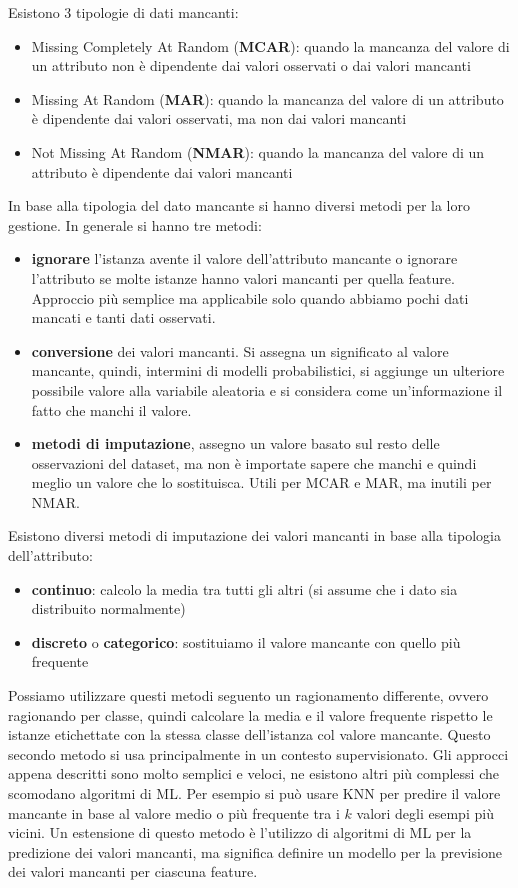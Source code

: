 Esistono 3 tipologie di dati mancanti:
\begin{itemize}
    \item Missing Completely At Random (\textbf{MCAR}): quando la mancanza del
    valore di un attributo non è dipendente dai valori osservati o dai valori mancanti
    \item Missing At Random (\textbf{MAR}): quando la mancanza del
    valore di un attributo è dipendente dai valori osservati, ma non dai valori mancanti
    \item Not Missing At Random (\textbf{NMAR}): quando la mancanza del
    valore di un attributo è dipendente dai valori mancanti
\end{itemize}
In base alla tipologia del dato mancante si hanno diversi metodi per la loro gestione.
In generale si hanno tre metodi:
\begin{itemize}
    \item \textbf{ignorare} l'istanza avente il valore dell'attributo mancante o 
    ignorare l'attributo se molte istanze hanno valori mancanti per quella feature.
    Approccio più semplice ma applicabile solo quando abbiamo pochi dati mancati 
    e tanti dati osservati.
    \item \textbf{conversione} dei valori mancanti. Si assegna un significato al
    valore mancante, quindi, intermini di modelli probabilistici, si aggiunge 
    un ulteriore possibile valore alla variabile aleatoria e si considera come 
    un'informazione il fatto che manchi il valore.
    \item \textbf{metodi di imputazione}, assegno un valore basato sul resto delle 
    osservazioni del dataset, ma non è importate sapere che manchi e quindi meglio 
    un valore che lo sostituisca. Utili per MCAR e MAR, ma inutili per NMAR. 
\end{itemize}
Esistono diversi metodi di imputazione dei valori mancanti in base alla tipologia
dell'attributo:
\begin{itemize}
    \item \textbf{continuo}: calcolo la media tra tutti gli altri (si assume che i dato sia distribuito normalmente)
    \item \textbf{discreto} o \textbf{categorico}: sostituiamo il valore mancante con
    quello più frequente
\end{itemize}
Possiamo utilizzare questi metodi seguento un ragionamento differente, ovvero
ragionando per classe, quindi calcolare la media e il valore frequente rispetto
le istanze etichettate con la stessa classe dell'istanza col valore mancante.
Questo secondo metodo si usa principalmente in un contesto supervisionato.
Gli approcci appena descritti sono molto semplici e veloci, ne esistono altri più
complessi che scomodano algoritmi di ML. Per esempio si può usare KNN per predire
il valore mancante in base al valore medio o più frequente tra i $k$ valori degli 
esempi più vicini. Un estensione di questo metodo è l'utilizzo di algoritmi di ML
per la predizione dei valori mancanti, ma significa definire un modello per la 
previsione dei valori mancanti per ciascuna feature.


